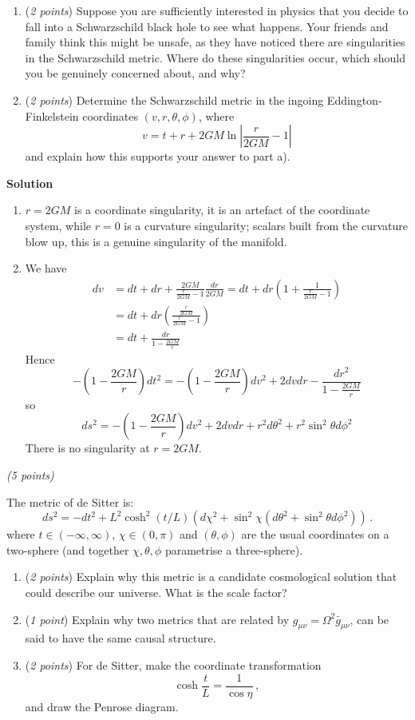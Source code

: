 \documentclass[12pt]{article}
\newcommand{\be}{\begin{equation}}
\newcommand{\ee}{\end{equation}}
\newcounter{quesno}
\newcommand{\ques}[1]{\vspace{3em}\stepcounter{quesno}
\noindent{\bf Question \thequesno.} \emph{(#1 points)\\}
}
\begin{document}
\begin{enumerate}[label=\alph*)]
\item  (\emph{2 points}) Suppose you are sufficiently interested in physics that you decide to fall into a Schwarzschild black hole to see what happens. 
Your friends and family think this might be unsafe, as they have noticed there are singularities in the Schwarzschild metric. 
Where do these singularities occur, which should you be genuinely concerned about, and why? 
\item (\emph{2 points}) Determine the Schwarzschild metric in the ingoing Eddington-Finkelstein coordinates $(v,r,\theta,\phi)$, where
\be
v = t + r + 2GM \ln\left| \frac{r}{2GM} - 1 \right|
\ee
and explain how this supports your answer to part a). 
\end{enumerate} 

{\color{red} {\bf Solution}

\begin{enumerate}[label=\alph*)]
\item $r=2GM$ is a coordinate singularity, it is an artefact of the coordinate system, while $r=0$ is a curvature singularity; scalars built from the curvature blow up, this is a genuine singularity of the manifold.
\item We have
\be
\begin{split}
dv & = dt + dr + \frac{2GM}{\frac{r}{2GM} - 1} \frac{dr}{2GM} = dt + dr \left( 1 + \frac{1}{\frac{r}{2GM} - 1} \right)
\\ &  = dt + dr \left( \frac{ \frac{r}{2GM} }{ \frac{r}{2GM} -1}\right) 
\\ & = dt + \frac{dr}{1-\frac{2GM}{r}}
\end{split}
\ee
Hence
\be
-\left(  1 - \frac{2GM}{r} \right) dt^2 = -\left(  1 - \frac{2GM}{r} \right) dv^2 + 2 dv dr - \frac{dr^2}{1- \frac{2GM}{r}}
\ee
so
\be
ds^2 = -\left(  1 - \frac{2GM}{r} \right) dv^2 + 2 dv dr + r^2 d \theta^2 + r^2 \sin^2 \theta d\phi^2 
\ee
There is no singularity at $r=2GM$.
\end{enumerate}
}


\ques{5}
The metric of de Sitter is:
\be
ds^2 =- dt^2 +  L^2  \cosh^2 (t/L) \left( d\chi^2 + \sin^2 \chi \left( d\theta^2 + \sin^2\theta d\phi^2 \right)\right)  \,.
\label{dsmetric} 
\ee
where $t \in (-\infty, \infty)$, $\chi \in (0,\pi)$ and $(\theta,\phi)$ are the usual coordinates on a two-sphere (and together $\chi, \theta,\phi$ parametrise a three-sphere).

\begin{enumerate}[label=\alph*)]
\item (\emph{2 points})  Explain why this metric is a candidate cosmological solution that could describe our universe. What is the scale factor?  
\item (\emph{1 point}) Explain why two metrics that are related by $g_{\mu\nu} = \Omega^2 \bar g_{\mu\nu}$, can be said to have the same causal structure. 
\item (\emph{2 points}) For de Sitter, make the coordinate transformation
\be
\cosh \frac{t}{L} = \frac{1}{\cos \eta} \,,
\ee
and draw the Penrose diagram. 

\end{enumerate}
\end{document}
